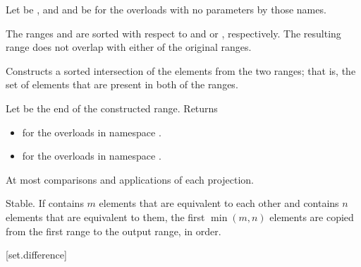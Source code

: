 \begin{itemdescr}
\pnum
Let  be ,
and  and  be 
for the overloads with no parameters by those names.

\pnum
\expects
The ranges  and  are sorted
with respect to  and  or , respectively.
The resulting range does not overlap with either of the original ranges.

\pnum
\effects
Constructs a sorted intersection of the elements from the two ranges;
that is, the set of elements that are present in both of the ranges.

\pnum
\returns
Let  be the end of the constructed range.
Returns
\begin{itemize}
\item
  for the overloads in namespace .
\item
  for the overloads in namespace .
\end{itemize}

\pnum
\complexity
At most 
comparisons and applications of each projection.

\pnum
\remarks
Stable.
If  contains $m$ elements
that are equivalent to each other and
 contains $n$ elements
that are equivalent to them,
the first $\min(m, n)$ elements
are copied from the first range to the output range, in order.
\end{itemdescr}

[set.difference]{}


